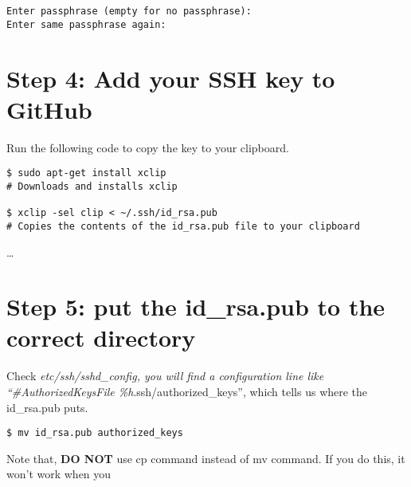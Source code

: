 \documentclass[11pt]{article}
\begin{document}
\begin{verbatim}
Enter passphrase (empty for no passphrase):
Enter same passphrase again:
\end{verbatim}
\section{Step 4: Add your SSH key to GitHub}
\label{sec-4}

Run the following code to copy the key to your clipboard.

\begin{verbatim}
$ sudo apt-get install xclip
# Downloads and installs xclip

$ xclip -sel clip < ~/.ssh/id_rsa.pub
# Copies the contents of the id_rsa.pub file to your clipboard
\end{verbatim}

\ldots{}
\section{Step 5: put the id\_rsa.pub to the correct directory}
\label{sec-5}

Check \emph{etc/ssh/sshd\_config,  you will find a configuration line like ``\#AuthorizedKeysFile  \%h}.ssh/authorized\_keys'', which tells us where the id\_rsa.pub puts.

\begin{verbatim}
$ mv id_rsa.pub authorized_keys
\end{verbatim}
Note that, \textbf{DO NOT} use cp command instead of mv command. If you do this, it won't work when you
\end{document}
